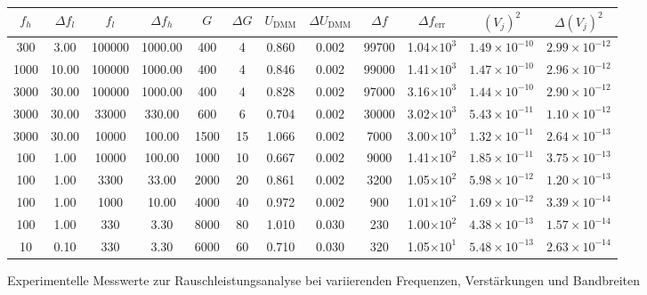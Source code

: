 \begin{minipage}{1.35\textwidth}
\begin{adjustbox}{width=0.9\textwidth}
\begin{tabular}{|c|c|c|c|c|c|c|c|c|c|c|c|}
\hline
$f_h$ & $\Delta f_l$ & $f_l$ & $\Delta f_h$ & $G$ & $\Delta G$ & $U_{\mathrm{DMM}}$ & $\Delta U_{\mathrm{DMM}}$ & $\Delta f$ & $\Delta f_{\text{err}}$ & $(V_j)^2$ & $\Delta (V_j)^2$ \\
\hline
300    & 3.00   & 100000  & 1000.00  & 400   & 4   & 0.860  & 0.002 & 99700  & 1.04$\times10^{3}$ & $1.49\times10^{-10}$ & $2.99\times10^{-12}$ \\
1000   & 10.00  & 100000  & 1000.00  & 400   & 4   & 0.846  & 0.002 & 99000  & 1.41$\times10^{3}$ & $1.47\times10^{-10}$ & $2.96\times10^{-12}$ \\
3000   & 30.00  & 100000  & 1000.00  & 400   & 4   & 0.828  & 0.002 & 97000  & 3.16$\times10^{3}$ & $1.44\times10^{-10}$ & $2.90\times10^{-12}$ \\
3000   & 30.00  & 33000   & 330.00   & 600   & 6   & 0.704  & 0.002 & 30000  & 3.02$\times10^{3}$ & $5.43\times10^{-11}$ & $1.10\times10^{-12}$ \\
3000   & 30.00  & 10000   & 100.00   & 1500  & 15  & 1.066  & 0.002 & 7000   & 3.00$\times10^{3}$ & $1.32\times10^{-11}$ & $2.64\times10^{-13}$ \\
100    & 1.00   & 10000   & 100.00   & 1000  & 10  & 0.667  & 0.002 & 9000   & 1.41$\times10^{2}$ & $1.85\times10^{-11}$ & $3.75\times10^{-13}$ \\
100    & 1.00   & 3300    & 33.00    & 2000  & 20  & 0.861  & 0.002 & 3200   & 1.05$\times10^{2}$ & $5.98\times10^{-12}$ & $1.20\times10^{-13}$ \\
100    & 1.00   & 1000    & 10.00    & 4000  & 40  & 0.972  & 0.002 & 900    & 1.01$\times10^{2}$ & $1.69\times10^{-12}$ & $3.39\times10^{-14}$ \\
100    & 1.00   & 330     & 3.30     & 8000  & 80  & 1.010  & 0.030 & 230    & 1.00$\times10^{2}$ & $4.38\times10^{-13}$ & $1.57\times10^{-14}$ \\
10     & 0.10   & 330     & 3.30     & 6000  & 60  & 0.710  & 0.030 & 320    & 1.05$\times10^{1}$ & $5.48\times10^{-13}$ & $2.63\times10^{-14}$ \\
\hline
\end{tabular}
\end{adjustbox}
\caption{Experimentelle Messwerte zur Rauschleistungsanalyse bei variierenden Frequenzen, Verstärkungen und Bandbreiten}
\label{tab:gerundet}
\end{minipage}\\ \\

